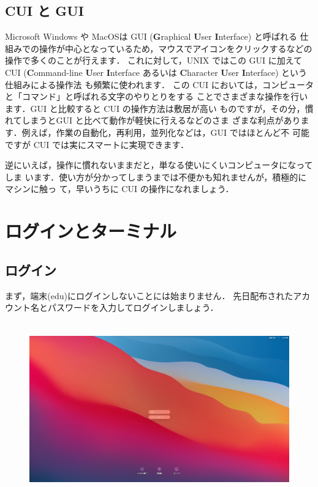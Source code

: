 \documentclass{jarticle}
\begin{document}
 \subsection{CUI と GUI}
 Microsoft Windows や MacOSは GUI (\textbf{G}raphical \textbf{U}ser \textbf{I}nterface) と呼ばれる
 仕組みでの操作が中心となっているため，マウスでアイコンをクリックするなどの操作で多くのことが行えます．
 これに対して，UNIX ではこの GUI に加えて CUI
 (\textbf{C}ommand-line \textbf{U}ser \textbf{I}nterface あるいは
 \textbf{C}haracter \textbf{U}ser \textbf{I}nterface) という仕組みによる操作法
 も頻繁に使われます．
 この CUI においては，コンピュータと「コマンド」と呼ばれる文字のやりとりをする
 ことでさまざまな操作を行います．GUI と比較すると CUI の操作方法は敷居が高い
 ものですが，その分，慣れてしまうとGUI と比べて動作が軽快に行えるなどのさま
 ざまな利点があります．例えば，作業の自動化，再利用，並列化などは，GUI ではほとんど不
 可能ですが CUI では実にスマートに実現できます．

 逆にいえば，操作に慣れないままだと，単なる使いにくいコンピュータになってしま
 います．使い方が分かってしまうまでは不便かも知れませんが，積極的にマシンに触っ
 て，早いうちに CUI の操作になれましょう．


\section{ログインとターミナル}
 \subsection{ログイン}
まず，端末(edu)にログインしないことには始まりません．
先日配布されたアカウント名とパスワードを入力してログインしましょう．

\begin{figure}[H]
  \centering
  \includegraphics[height=7.5cm]{fig/MacLogin.png}
\end{figure}
\end{document}
